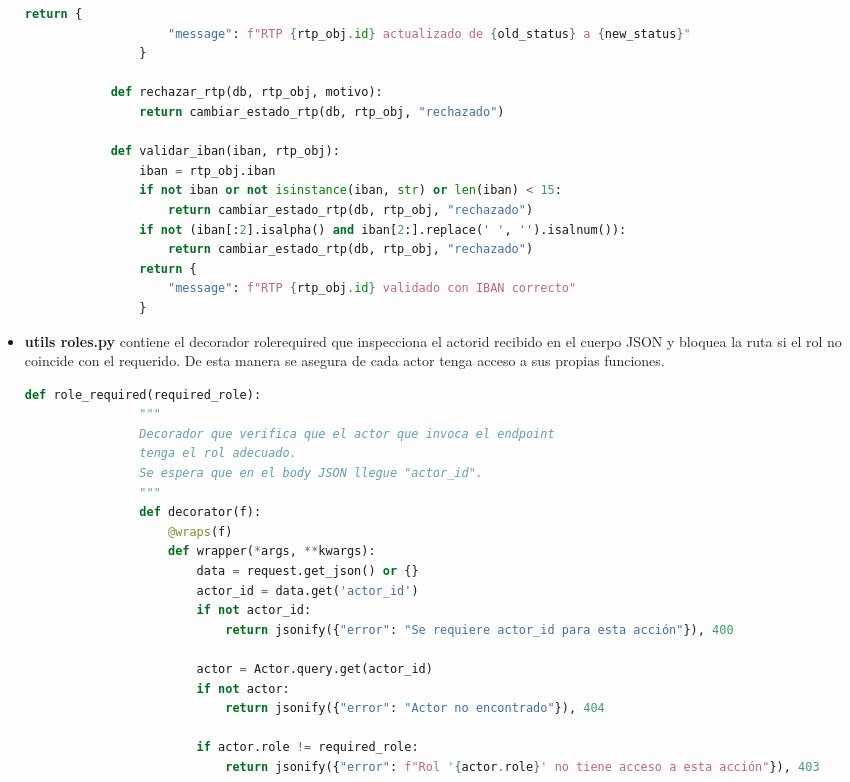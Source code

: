 \begin{itemize}
\begin{lstlisting}[language=Python, style=custom, caption={Funciones utilitarias}]
                return {
                    "message": f"RTP {rtp_obj.id} actualizado de {old_status} a {new_status}"
                }

            def rechazar_rtp(db, rtp_obj, motivo):
                return cambiar_estado_rtp(db, rtp_obj, "rechazado")

            def validar_iban(iban, rtp_obj):
                iban = rtp_obj.iban
                if not iban or not isinstance(iban, str) or len(iban) < 15:
                    return cambiar_estado_rtp(db, rtp_obj, "rechazado")
                if not (iban[:2].isalpha() and iban[2:].replace(' ', '').isalnum()):
                    return cambiar_estado_rtp(db, rtp_obj, "rechazado")
                return {
                    "message": f"RTP {rtp_obj.id} validado con IBAN correcto"
                }

            \end{lstlisting}

    \item \textbf{utils roles.py} contiene el decorador rolerequired que inspecciona el actorid recibido en el cuerpo JSON y bloquea la ruta si el rol no coincide con el requerido.
            De esta manera se asegura de cada actor tenga acceso a sus propias funciones.

            \begin{lstlisting}[language=Python, style=custom, caption={Decorador para control de funciones}]
                def role_required(required_role):
                """
                Decorador que verifica que el actor que invoca el endpoint
                tenga el rol adecuado.
                Se espera que en el body JSON llegue "actor_id".
                """
                def decorator(f):
                    @wraps(f)
                    def wrapper(*args, **kwargs):
                        data = request.get_json() or {}
                        actor_id = data.get('actor_id')
                        if not actor_id:
                            return jsonify({"error": "Se requiere actor_id para esta acción"}), 400

                        actor = Actor.query.get(actor_id)
                        if not actor:
                            return jsonify({"error": "Actor no encontrado"}), 404

                        if actor.role != required_role:
                            return jsonify({"error": f"Rol '{actor.role}' no tiene acceso a esta acción"}), 403


\end{lstlisting}
\end{itemize}
